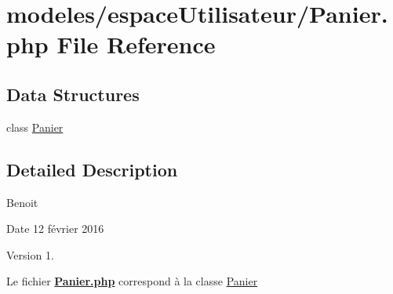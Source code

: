 \hypertarget{_panier_8php}{}\section{modeles/espace\+Utilisateur/\+Panier.php File Reference}
\label{_panier_8php}
\subsection*{Data Structures}
\begin{DoxyCompactItemize}
\item 
class \hyperlink{class_panier}{Panier}
\end{DoxyCompactItemize}


\subsection{Detailed Description}
Benoit \begin{DoxyDate}{Date}
12 février 2016 
\end{DoxyDate}
\begin{DoxyVersion}{Version}
1.
\end{DoxyVersion}
Le fichier {\bfseries \hyperlink{_panier_8php}{Panier.\+php}} correspond à la classe \hyperlink{class_panier}{Panier} 